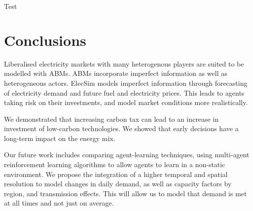 Test


\section{Conclusions}



Liberalised electricity markets with many heterogenous players are suited to be modelled with ABMs. ABMs incorporate imperfect information as well as heterogeneous actors. ElecSim models imperfect information through forecasting of electricity demand and future fuel and electricity prices. This leads to agents taking risk on their investments, and model market conditions more realistically.

We demonstrated that increasing carbon tax can lead to an increase in investment of low-carbon technologies. We showed that early decisions have a long-term impact on the energy mix. 

Our future work includes comparing agent-learning techniques, using multi-agent reinforcement learning algorithms to allow agents to learn in a non-static environment. We propose the integration of a higher temporal and spatial resolution to model changes in daily demand, as well as capacity factors by region, and transmission effects. This will allow us to model that demand is met at all times and not just on average. 








